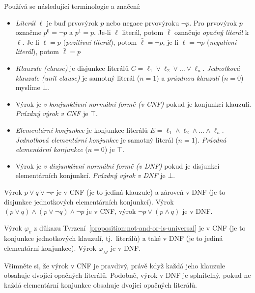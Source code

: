 Používá se následující terminologie a značení:
\begin{itemize}
    \item \emph{Literál} $\ell$ je buď prvovýrok $p$ nebo negace prvovýroku $\neg p$. Pro prvovýrok $p$ označme $p^0=\neg p$ a $p^1=p$. Je-li $\ell$ literál, potom $\bar \ell$ označuje \emph{opačný literál} k $\ell$. Je-li $\ell=p$ (\emph{pozitivní literál}), potom $\bar \ell=\neg p$, je-li $\ell=\neg p$ (\emph{negativní literál}), potom $\bar \ell=p$
    \item \emph{Klauzule (clause)} je disjunkce literálů $C=\ell_1\lor\ell_2\lor\dots\lor\ell_n$. \emph{Jednotková klauzule (unit clause)} je samotný literál ($n=1$) a \emph{prázdnou klauzulí} ($n=0$) myslíme $\bot$.
    \item Výrok je \emph{v konjunktivní normální formě (v CNF)} pokud je konjunkcí klauzulí. \emph{Prázdný výrok v CNF} je $\top$.
    \item \emph{Elementární konjunkce} je konjunkce literálů $E=\ell_1\land\ell_2\land\dots\land\ell_n$. \emph{Jednotková elementární konjunkce} je samotný literál ($n=1$). \emph{Prázdná elementární konjunkce} ($n=0$) je $\top$.
    \item Výrok je \emph{v disjunktivní normální formě (v DNF)} pokud je disjunkcí elementárních konjunkcí. \emph{Prázdný výrok v DNF} je $\bot$.
\end{itemize}

\begin{example}
    Výrok ${{p\lor q}\lor\neg r}$ je v CNF (je to jediná klauzule) a zároveň v DNF (je to disjunkce jednotkových elementárních konjunkcí). Výrok $(p\lor q)\land (p\lor \neg q)\land \neg p$ je v CNF, výrok $\neg p\lor (p\land q)$ je v DNF.
\end{example}

\begin{example}
    Výrok $\varphi_v$ z důkazu Tvrzení~\ref{proposition:not-and-or-is-universal} je v CNF (je to konjunkce jednotkových klauzulí, tj.\ literálů) a také v DNF (je to jediná elementární konjunkce). Výrok $\varphi_M$ je v DNF.
\end{example}

\begin{observation}
Všimněte si, že výrok v CNF je pravdivý, právě když každá jeho klauzule obsahuje dvojici opačných literálů. Podobně, výrok v DNF je splnitelný, pokud ne každá elementární konjunkce obsahuje dvojici opačných literálů.
\end{observation}

